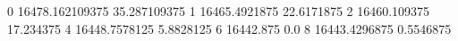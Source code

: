 0 16478.162109375 35.287109375
1 16465.4921875 22.6171875
2 16460.109375 17.234375
4 16448.7578125 5.8828125
6 16442.875 0.0
8 16443.4296875 0.5546875
